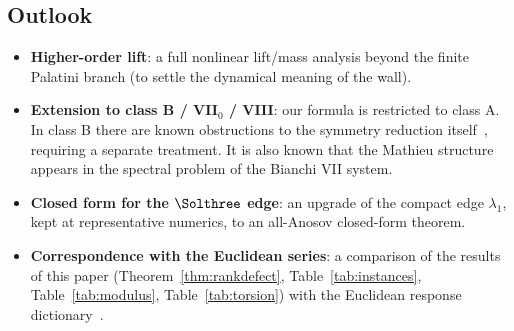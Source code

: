 \subsection{Outlook}
\label{sec:discussion:outlook}

\begin{itemize}
  \item \textbf{Higher-order lift}: a full nonlinear lift/mass analysis beyond
        the finite Palatini branch (to settle the dynamical meaning of the wall).
  \item \textbf{Extension to class B / VII$_{0}$ / VIII}: our formula is
        restricted to class A.  In class B there are known obstructions to the
        symmetry reduction itself~\cite{ref21}, requiring a separate treatment.
        It is also known that the Mathieu structure appears in the spectral
        problem of the Bianchi VII system.
  \item \textbf{Closed form for the $\Solthree$ edge}: an upgrade of the compact
        edge $\lambda_{1}$, kept at representative numerics, to an all-Anosov
        closed-form theorem.
  \item \textbf{Correspondence with the Euclidean series}: a comparison of the
        results of this paper (Theorem~\ref{thm:rankdefect},
        Table~\ref{tab:instances}, Table~\ref{tab:modulus},
        Table~\ref{tab:torsion}) with the Euclidean response
        dictionary~\cite{ref4,ref5}.
\end{itemize}
